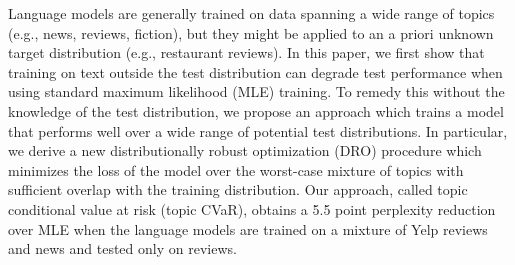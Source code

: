 Language models are generally trained on data spanning a wide range of topics (e.g., news, reviews, fiction),
but they might be applied to an a priori unknown target distribution (e.g., restaurant reviews).
In this paper, we first show that training on text outside the test distribution can degrade test performance when using standard maximum likelihood (MLE) training.
To remedy this without the knowledge of the test distribution, we propose an approach which trains a model that performs well over a wide range of potential test distributions. 
In particular, we derive a new distributionally robust optimization (DRO) procedure which minimizes the loss of the model over the worst-case mixture of topics with sufficient overlap with the training distribution. 
Our approach, called topic conditional value at risk (topic CVaR), obtains a 5.5 point perplexity reduction over MLE when the language models are trained on a mixture of Yelp reviews and news and tested only on reviews.